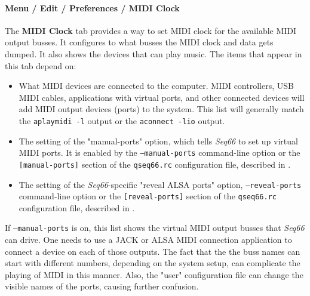 
\paragraph{Menu / Edit / Preferences / MIDI Clock}
\label{paragraph:seq66_menu_edit_preferences_midi_clock}

   The \textbf{MIDI Clock} tab provides a way to set MIDI clock for
   the available MIDI output busses.
   It configures to what busses the MIDI clock and data gets dumped.
   It also shows the devices that can play music.
   The items that appear in this tab depend on:

   \begin{itemize}
      \item What MIDI devices are connected to the computer.
         MIDI controllers, USB MIDI cables, applications with virtual
         ports, and other connected devices will add MIDI
         output devices (ports) to the system.
         This list will generally match the \texttt{aplaymidi -l} output or the
         \texttt{aconnect -lio} output.
      \item The setting of the "manual-ports" option, which tells
         \textsl{Seq66} to set up virtual MIDI ports.
         It is enabled by the
         \texttt{--manual-ports} command-line option or the
         \texttt{[manual-ports]} section of the
         \texttt{qseq66.rc} configuration file, described in
         .
      \item The setting of the \textsl{Seq66}-specific
         "reveal ALSA ports" option,
         \texttt{--reveal-ports} command-line option or the
         \texttt{[reveal-ports]} section of the
         \texttt{qseq66.rc} configuration file, described in
         .
   \end{itemize}

   If \texttt{--manual-ports} is on, this list shows the virtual
   MIDI output busses that \textsl{Seq66} can drive.
   One needs to use a JACK or ALSA MIDI
   connection application to connect a device on each of those outputs.
   The fact that the the buss names can
   start with different numbers, depending on the system setup, can complicate
   the playing of MIDI in this manner.  Also, the "user" configuration file can
   change the visible names of the ports, causing further confusion.

